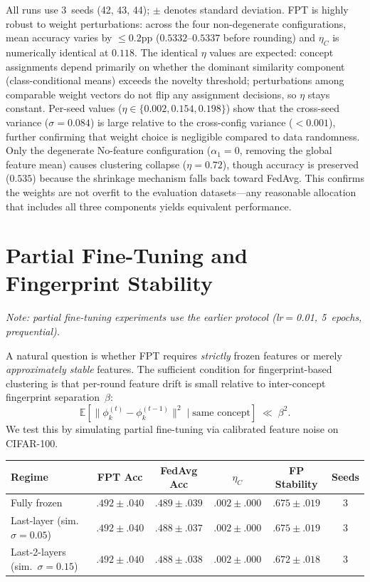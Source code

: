 \documentclass[11pt]{article}
\newcommand{\E}{\mathbb{E}}
\begin{document}
\noindent All runs use 3~seeds (42, 43, 44); $\pm$ denotes standard deviation.
FPT is highly robust to weight perturbations: across the four non-degenerate configurations, mean accuracy varies by $\le 0.2$pp ($0.5332$--$0.5337$ before rounding) and $\eta_C$ is numerically identical at $0.118$.
The identical $\eta$ values are expected: concept assignments depend primarily on whether the dominant similarity component (class-conditional means) exceeds the novelty threshold; perturbations among comparable weight vectors do not flip any assignment decisions, so $\eta$ stays constant.
Per-seed values ($\eta \in \{0.002, 0.154, 0.198\}$) show that the cross-seed variance ($\sigma = 0.084$) is large relative to the cross-config variance ($< 0.001$), further confirming that weight choice is negligible compared to data randomness.
Only the degenerate No-feature configuration ($\alpha_1 = 0$, removing the global feature mean) causes clustering collapse ($\eta = 0.72$), though accuracy is preserved ($0.535$) because the shrinkage mechanism falls back toward FedAvg.
This confirms the weights are not overfit to the evaluation datasets---any reasonable allocation that includes all three components yields equivalent performance.


\section{Partial Fine-Tuning and Fingerprint Stability}
\label{app:partial_finetune}

\emph{Note: partial fine-tuning experiments use the earlier protocol (lr$=$0.01, 5~epochs, prequential).}

A natural question is whether FPT requires \emph{strictly} frozen features or merely \emph{approximately stable} features.
The sufficient condition for fingerprint-based clustering is that per-round feature drift is small relative to inter-concept fingerprint separation~$\beta$:
\begin{equation}
\E[\|\phi_k^{(t)} - \phi_k^{(t-1)}\|^2 \mid \text{same concept}] \;\ll\; \beta^2.
\end{equation}
We test this by simulating partial fine-tuning via calibrated feature noise on CIFAR-100.

\begin{center}
\small
\begin{tabular}{lccccc}
\toprule
Regime & FPT Acc & FedAvg Acc & $\eta_C$ & FP Stability & Seeds \\
\midrule
Fully frozen & $.492 \pm .040$ & $.489 \pm .039$ & $.002 \pm .000$ & $.675 \pm .019$ & 3 \\
Last-layer (sim.\ $\sigma{=}0.05$) & $.492 \pm .040$ & $.488 \pm .037$ & $.002 \pm .000$ & $.675 \pm .019$ & 3 \\
Last-2-layers (sim.\ $\sigma{=}0.15$) & $.492 \pm .040$ & $.488 \pm .038$ & $.002 \pm .000$ & $.672 \pm .018$ & 3 \\
\bottomrule
\end{tabular}
\end{center}
\end{document}
